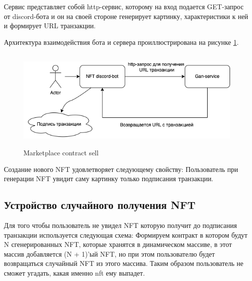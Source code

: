 	Сервис представляет собой http-сервис, которому на вход подается GET-запрос от discord-бота и он на своей стороне генерирует картинку, характеристики к ней и формирует URL транзакции.

	Архитектура взаимодействия бота и сервера проиллюстрирована на рисунке {\color{blue} \ref{fig.ganservice}}.
	\begin{figure}
		\centering
		\includegraphics[height=50mm]{fig/gan-service.png}
		\caption{Marketplace contract sell}
		\label{fig.ganservice}
	\end{figure}


\begin{remark}
	Создание нового NFT удовлетворяет следующему свойству: Пользователь при генерации NFT увидит саму картинку только подписания транзакции.
\end{remark}

\subsection{Устройство случайного получения NFT}
 Для того чтобы пользователь не увидел NFT которую получит до подписания транзакции используется следующая схема:
  Формируем контракт в котором будут N сгенерированных NFT, которые хранятся в динамическом массиве, в этот массив добавляется (N + 1)'ый NFT, но при этом пользователю будет возвращаться случайный NFT из этого массива.
  Таким образом пользователь не сможет угадать, какая именно nft ему выпадет.
